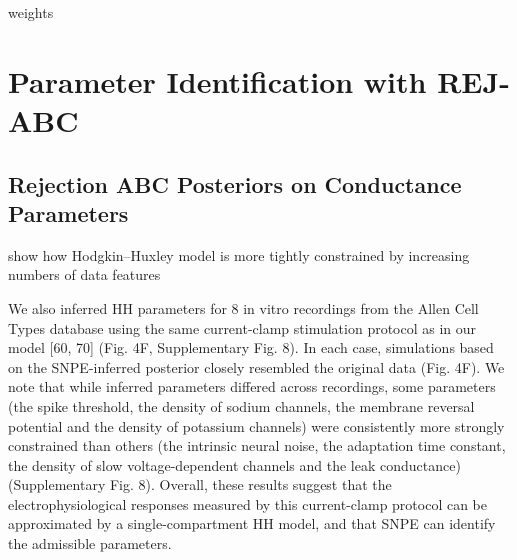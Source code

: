 weights


\chapter{Parameter Identification with REJ-ABC}

\section{Rejection ABC Posteriors on Conductance Parameters}

show how Hodgkin–Huxley model is more tightly constrained by increasing numbers of data features

We also inferred HH parameters for 8 in vitro recordings from the Allen Cell Types database using the same current-clamp stimulation protocol as in our model [60, 70] (Fig. 4F, Supplementary Fig. 8). In each case, simulations based on the SNPE-inferred posterior closely resembled the original data (Fig. 4F). We note that while inferred parameters differed across recordings, some parameters (the spike threshold, the density of sodium channels, the membrane reversal potential and the density of potassium channels) were consistently more strongly constrained than others (the intrinsic neural noise, the adaptation time constant, the density of slow voltage-dependent channels and the leak conductance) (Supplementary Fig. 8). Overall, these results suggest that the electrophysiological responses measured by this current-clamp protocol can be approximated by a single-compartment HH model, and that SNPE can identify the admissible parameters.





